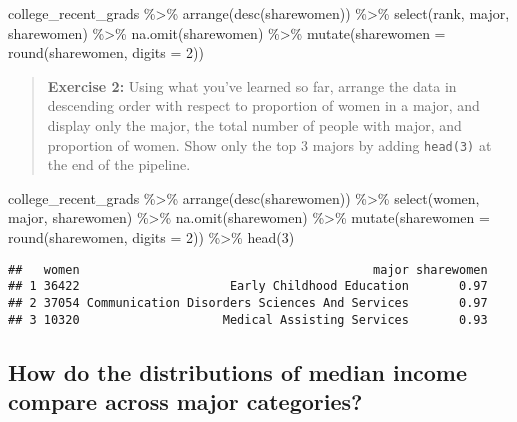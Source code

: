 \documentclass[
]{article}
\newenvironment{Shaded}{\begin{snugshade}}{\end{snugshade}}
\newcommand{\AttributeTok}[1]{\textcolor[rgb]{0.77,0.63,0.00}{#1}}
\newcommand{\DecValTok}[1]{\textcolor[rgb]{0.00,0.00,0.81}{#1}}
\newcommand{\FunctionTok}[1]{\textcolor[rgb]{0.00,0.00,0.00}{#1}}
\newcommand{\NormalTok}[1]{#1}
\newcommand{\SpecialCharTok}[1]{\textcolor[rgb]{0.00,0.00,0.00}{#1}}
\begin{document}
\begin{Shaded}
\begin{Highlighting}[]
\NormalTok{college\_recent\_grads }\SpecialCharTok{\%\textgreater{}\%}
  \FunctionTok{arrange}\NormalTok{(}\FunctionTok{desc}\NormalTok{(sharewomen)) }\SpecialCharTok{\%\textgreater{}\%}
  \FunctionTok{select}\NormalTok{(rank, major, sharewomen) }\SpecialCharTok{\%\textgreater{}\%}
  \FunctionTok{na.omit}\NormalTok{(sharewomen) }\SpecialCharTok{\%\textgreater{}\%}
  \FunctionTok{mutate}\NormalTok{(}\AttributeTok{sharewomen =} \FunctionTok{round}\NormalTok{(sharewomen, }\AttributeTok{digits =} \DecValTok{2}\NormalTok{))}
\end{Highlighting}
\end{Shaded}

\begin{quote}
\textbf{Exercise 2:} Using what you've learned so far, arrange the data
in descending order with respect to proportion of women in a major, and
display only the major, the total number of people with major, and
proportion of women. Show only the top 3 majors by adding
\texttt{head(3)} at the end of the pipeline.
\end{quote}

\begin{Shaded}
\begin{Highlighting}[]
\NormalTok{college\_recent\_grads }\SpecialCharTok{\%\textgreater{}\%}
  \FunctionTok{arrange}\NormalTok{(}\FunctionTok{desc}\NormalTok{(sharewomen)) }\SpecialCharTok{\%\textgreater{}\%}
  \FunctionTok{select}\NormalTok{(women, major, sharewomen) }\SpecialCharTok{\%\textgreater{}\%}
  \FunctionTok{na.omit}\NormalTok{(sharewomen) }\SpecialCharTok{\%\textgreater{}\%}
  \FunctionTok{mutate}\NormalTok{(}\AttributeTok{sharewomen =} \FunctionTok{round}\NormalTok{(sharewomen, }\AttributeTok{digits =} \DecValTok{2}\NormalTok{)) }\SpecialCharTok{\%\textgreater{}\%}
  \FunctionTok{head}\NormalTok{(}\DecValTok{3}\NormalTok{)}
\end{Highlighting}
\end{Shaded}

\begin{verbatim}
##   women                                         major sharewomen
## 1 36422                     Early Childhood Education       0.97
## 2 37054 Communication Disorders Sciences And Services       0.97
## 3 10320                    Medical Assisting Services       0.93
\end{verbatim}

\hypertarget{how-do-the-distributions-of-median-income-compare-across-major-categories}{%
\subsection{How do the distributions of median income compare across
major
categories?}\label{how-do-the-distributions-of-median-income-compare-across-major-categories}}
\end{document}
